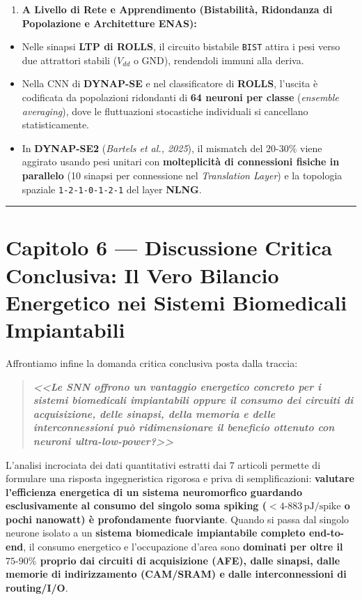 \documentclass[11pt,a4paper]{article}
\begin{document}
\begin{enumerate}
  \item \textbf{A Livello di Rete e Apprendimento (Bistabilità, Ridondanza di Popolazione e Architetture ENAS):}
\end{enumerate}
\begin{itemize}
  \item Nelle sinapsi \textbf{LTP di ROLLS}, il circuito bistabile \texttt{BIST} attira i pesi verso due attrattori stabili ($V_{dd}$ o $\text{GND}$), rendendoli immuni alla deriva.
  \item Nella CNN di \textbf{DYNAP-SE} e nel classificatore di \textbf{ROLLS}, l'uscita è codificata da popolazioni ridondanti di \textbf{64 neuroni per classe} (\textit{ensemble averaging}), dove le fluttuazioni stocastiche individuali si cancellano statisticamente.
  \item In \textbf{DYNAP-SE2} (\textit{Bartels et al., 2025}), il mismatch del $20\text{-}30\%$ viene aggirato usando pesi unitari con \textbf{molteplicità di connessioni fisiche in parallelo} (10 sinapsi per connessione nel \textit{Translation Layer}) e la topologia spaziale \texttt{1-2-1-0-1-2-1} del layer \textbf{NLNG}.
\end{itemize}

\bigskip\hrule\bigskip

\section{Capitolo 6 --- Discussione Critica Conclusiva: Il Vero Bilancio Energetico nei Sistemi Biomedicali Impiantabili}

Affrontiamo infine la domanda critica conclusiva posta dalla traccia:

\begin{quote}
\textbf{\textit{<<Le SNN offrono un vantaggio energetico concreto per i sistemi biomedicali impiantabili oppure il consumo dei circuiti di acquisizione, delle sinapsi, della memoria e delle interconnessioni può ridimensionare il beneficio ottenuto con neuroni ultra-low-power?>>}}
\end{quote}

L'analisi incrociata dei dati quantitativi estratti dai 7 articoli permette di formulare una risposta ingegneristica rigorosa e priva di semplificazioni: \textbf{valutare l'efficienza energetica di un sistema neuromorfico guardando esclusivamente al consumo del singolo soma spiking ($<4\text{-}883\,\text{pJ/spike}$ o pochi nanowatt) è profondamente fuorviante}. Quando si passa dal singolo neurone isolato a un \textbf{sistema biomedicale impiantabile completo end-to-end}, il consumo energetico e l'occupazione d'area sono \textbf{dominati per oltre il $75\text{-}90\%$ proprio dai circuiti di acquisizione (AFE), dalle sinapsi, dalle memorie di indirizzamento (CAM/SRAM) e dalle interconnessioni di routing/I/O}.
\end{document}
